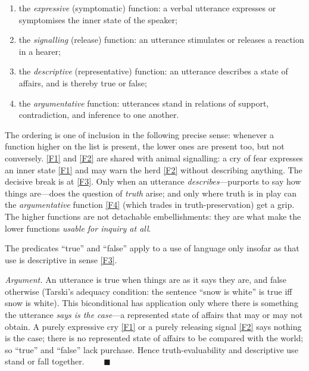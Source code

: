 \documentclass[12pt]{article}
\begin{document}
\begin{enumerate}[label=(F\arabic*),leftmargin=2.4em]
\item\label{F1} the \emph{expressive} (symptomatic) function: a verbal
utterance expresses or symptomises the inner state of the speaker;
\item\label{F2} the \emph{signalling} (release) function: an utterance
stimulates or releases a reaction in a hearer;
\item\label{F3} the \emph{descriptive} (representative) function: an
utterance describes a state of affairs, and is thereby true or false;
\item\label{F4} the \emph{argumentative} function: utterances stand in
relations of support, contradiction, and inference to one another.
\end{enumerate}

The ordering is one of inclusion in the following precise sense: whenever
a function higher on the list is present, the lower ones are present too,
but not conversely. \ref{F1} and \ref{F2} are shared with animal
signalling: a cry of fear expresses an inner state \ref{F1} and may warn
the herd \ref{F2} without describing anything. The decisive break is at
\ref{F3}. Only when an utterance \emph{describes}---purports to say how
things are---does the question of \emph{truth} arise; and only where
truth is in play can the \emph{argumentative} function \ref{F4} (which
trades in truth-preservation) get a grip. The higher functions are not
detachable embellishments: they are what make the lower functions
\emph{usable for inquiry at all}.

\begin{description}[leftmargin=1.6em,style=nextline]
\item[Lemma 1 (Truth presupposes description).] The predicates ``true''
and ``false'' apply to a use of language only insofar as that use is
descriptive in sense \ref{F3}.
\end{description}

\noindent\emph{Argument.} An utterance is true when things are as it says
they are, and false otherwise (Tarski's adequacy condition: the sentence
``snow is white'' is true iff snow is white). This biconditional has
application only where there is something the utterance \emph{says is the
case}---a represented state of affairs that may or may not obtain. A
purely expressive cry \ref{F1} or a purely releasing signal \ref{F2} says
nothing is the case; there is no represented state of affairs to be
compared with the world; so ``true'' and ``false'' lack purchase. Hence
truth-evaluability and descriptive use stand or fall together.
$\qquad\blacksquare$
\end{document}
